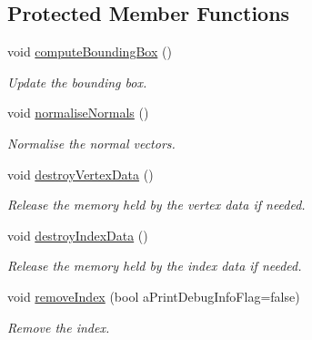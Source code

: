 \subsection*{Protected Member Functions}
\begin{DoxyCompactItemize}
\item 
void \hyperlink{class_graphics_1_1_polygon_mesh_a2c4bbe3f05df1d4e49214a10895c03a2}{computeBoundingBox} ()
\begin{DoxyCompactList}\small\item\em Update the bounding box. \end{DoxyCompactList}\item 
void \hyperlink{class_graphics_1_1_polygon_mesh_ac0625fa4506cab4d42f3f83f332912d9}{normaliseNormals} ()
\begin{DoxyCompactList}\small\item\em Normalise the normal vectors. \end{DoxyCompactList}\item 
void \hyperlink{class_graphics_1_1_polygon_mesh_acab2607f9049bd014aa832476bb9639f}{destroyVertexData} ()
\begin{DoxyCompactList}\small\item\em Release the memory held by the vertex data if needed. \end{DoxyCompactList}\item 
void \hyperlink{class_graphics_1_1_polygon_mesh_aef6d6127e866fce09c2245550a518a9c}{destroyIndexData} ()
\begin{DoxyCompactList}\small\item\em Release the memory held by the index data if needed. \end{DoxyCompactList}\item 
void \hyperlink{class_graphics_1_1_polygon_mesh_af10ea58e6dd63cd085662ae255c26054}{removeIndex} (bool aPrintDebugInfoFlag=false)
\begin{DoxyCompactList}\small\item\em Remove the index. \end{DoxyCompactList}\end{DoxyCompactItemize}
